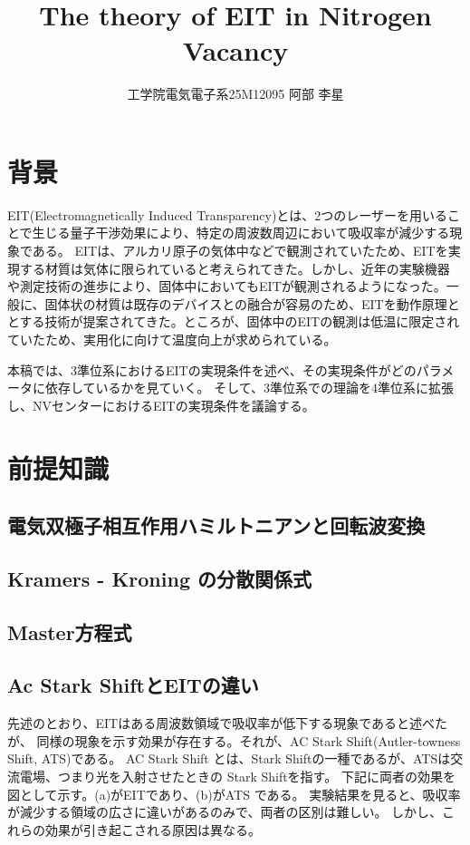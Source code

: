 \documentclass[11pt,a4paper]{ltjsarticle}
\title{The theory of EIT in Nitrogen Vacancy }
\author{工学院電気電子系25M12095 阿部 李星}
\begin{document}
\maketitle

\tableofcontents


\clearpage






\section{背景}
EIT(Electromagnetically Induced Transparency)とは、2つのレーザーを用いることで生じる量子干渉効果により、特定の周波数周辺において吸収率が減少する現象である。
EITは、アルカリ原子の気体中などで観測されていたため、EITを実現する材質は気体に限られていると考えられてきた。しかし、近年の実験機器
や測定技術の進歩により、固体中においてもEITが観測されるようになった。一般に、固体状の材質は既存のデバイスとの融合が容易のため、EITを動作原理と
とする技術が提案されてきた。ところが、固体中のEITの観測は低温に限定されていたため、実用化に向けて温度向上が求められている。

 本稿では、3準位系におけるEITの実現条件を述べ、その実現条件がどのパラメータに依存しているかを見ていく。
そして、3準位系での理論を4準位系に拡張し、NVセンターにおけるEITの実現条件を議論する。


\section{前提知識}

\subsection{電気双極子相互作用ハミルトニアンと回転波変換}

\subsection{Kramers - Kroning の分散関係式}

\subsection{Master方程式}


\subsection{Ac Stark ShiftとEITの違い}
先述のとおり、EITはある周波数領域で吸収率が低下する現象であると述べたが、
同様の現象を示す効果が存在する。それが、AC Stark Shift(Autler-towness Shift, ATS)である。
AC Stark Shift とは、Stark Shiftの一種であるが、ATSは交流電場、つまり光を入射させたときの
Stark Shiftを指す。
下記に両者の効果を図として示す。(a)がEITであり、(b)がATS である。
実験結果を見ると、吸収率が減少する領域の広さに違いがあるのみで、両者の区別は難しい。
しかし、これらの効果が引き起こされる原因は異なる。
\end{document}
